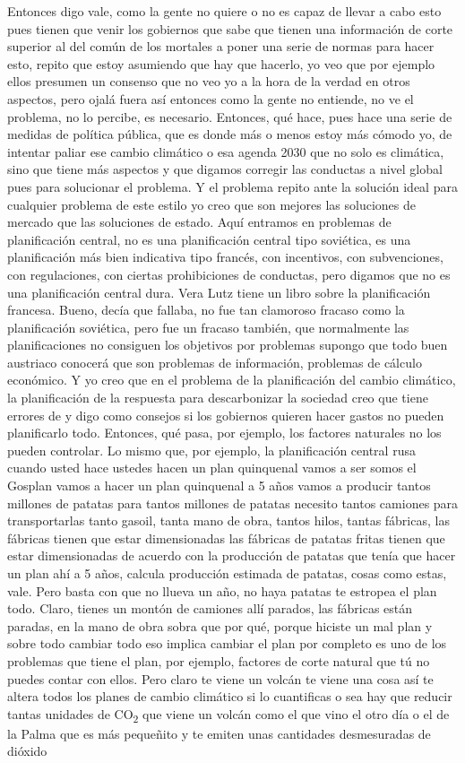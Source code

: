 Entonces digo vale, como la gente no quiere o no es capaz de llevar a cabo esto pues tienen que venir los gobiernos que sabe que tienen una información de corte superior al del común de los mortales a poner una serie de normas para hacer esto, repito que estoy asumiendo que hay que hacerlo, yo veo que por ejemplo ellos presumen un consenso que no veo yo a la hora de la verdad en otros aspectos, pero ojalá fuera así entonces como la gente no entiende, no ve el problema, no lo percibe, es necesario. Entonces, qué hace, pues hace una serie de medidas de política pública, que es donde más o menos estoy más cómodo yo, de intentar paliar ese cambio climático o esa agenda 2030 que no solo es climática, sino que tiene más aspectos y que digamos corregir las conductas a nivel global pues para solucionar el problema. Y el problema repito ante la solución ideal para cualquier problema de este estilo yo creo que son mejores las soluciones de mercado que las soluciones de estado. Aquí entramos en problemas de planificación central, no es una planificación central tipo soviética, es una planificación más bien indicativa tipo francés, con incentivos, con subvenciones, con regulaciones, con ciertas prohibiciones de conductas, pero digamos que no es una planificación central dura. Vera Lutz tiene un libro sobre la planificación francesa\cite{lutz1965french}. Bueno, decía que fallaba, no fue tan clamoroso fracaso como la planificación soviética, pero fue un fracaso también, que normalmente las planificaciones no consiguen los objetivos por problemas supongo que todo buen austriaco conocerá que son problemas de información, problemas de cálculo económico. Y yo creo que en el problema de la planificación del cambio climático, la planificación de la respuesta para descarbonizar la sociedad creo que tiene errores de y digo como consejos si los gobiernos quieren hacer gastos no pueden planificarlo todo. Entonces, qué pasa, por ejemplo, los factores naturales no los pueden controlar. Lo mismo que, por ejemplo, la planificación central rusa cuando usted hace ustedes hacen un plan quinquenal vamos a ser somos el Gosplan vamos a hacer un plan quinquenal a 5 años vamos a producir tantos millones de patatas para tantos millones de patatas necesito tantos camiones para transportarlas tanto gasoil, tanta mano de obra, tantos hilos, tantas fábricas, las fábricas tienen que estar dimensionadas las fábricas de patatas fritas tienen que estar dimensionadas de acuerdo con la producción de patatas que tenía que hacer un plan ahí a 5 años, calcula producción estimada de patatas, cosas como estas, vale. Pero basta con que no llueva un año, no haya patatas te estropea el plan todo. Claro, tienes un montón de camiones allí parados, las fábricas están paradas, en la mano de obra sobra que por qué, porque hiciste un mal plan y sobre todo cambiar todo eso implica cambiar el plan por completo es uno de los problemas que tiene el plan, por ejemplo, factores de corte natural que tú no puedes contar con ellos. Pero claro te viene un volcán te viene una cosa así te altera todos los planes de cambio climático si lo cuantificas o sea hay que reducir tantas unidades de CO\textsubscript{2} que viene un volcán como el que vino el otro día o el de la Palma que es más pequeñito y te emiten unas cantidades desmesuradas de dióxido 